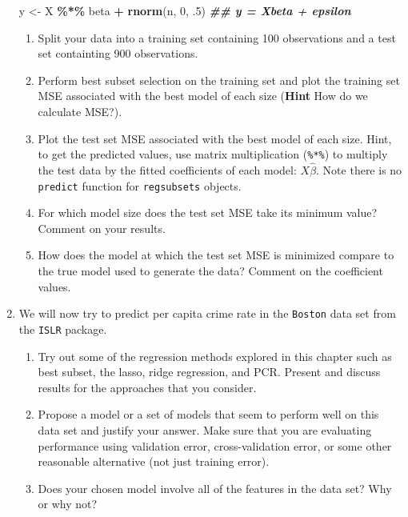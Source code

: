 \documentclass[
]{article}
\newenvironment{Shaded}{\begin{snugshade}}{\end{snugshade}}
\newcommand{\DecValTok}[1]{\textcolor[rgb]{0.00,0.00,0.81}{#1}}
\newcommand{\DocumentationTok}[1]{\textcolor[rgb]{0.56,0.35,0.01}{\textbf{\textit{#1}}}}
\newcommand{\FunctionTok}[1]{\textcolor[rgb]{0.13,0.29,0.53}{\textbf{#1}}}
\newcommand{\NormalTok}[1]{#1}
\newcommand{\OtherTok}[1]{\textcolor[rgb]{0.56,0.35,0.01}{#1}}
\newcommand{\SpecialCharTok}[1]{\textcolor[rgb]{0.81,0.36,0.00}{\textbf{#1}}}
\begin{document}
\begin{enumerate}
\begin{Shaded}
\begin{Highlighting}[]
\NormalTok{y }\OtherTok{\textless{}{-}}\NormalTok{ X }\SpecialCharTok{\%*\%}\NormalTok{ beta }\SpecialCharTok{+} \FunctionTok{rnorm}\NormalTok{(n, }\DecValTok{0}\NormalTok{, .}\DecValTok{5}\NormalTok{) }\DocumentationTok{\#\# y = Xbeta + epsilon}
\end{Highlighting}
\end{Shaded}

  \begin{enumerate}
  \def\labelenumii{\alph{enumii}.}
  \item
    Split your data into a training set containing 100 observations and
    a test set containting 900 observations.
  \item
    Perform best subset selection on the training set and plot the
    training set MSE associated with the best model of each size
    (\textbf{Hint} How do we calculate MSE?).
  \item
    Plot the test set MSE associated with the best model of each size.
    Hint, to get the predicted values, use matrix multiplication
    (\texttt{\%*\%}) to multiply the test data by the fitted
    coefficients of each model: \(X\hat{\beta}\). Note there is no
    \texttt{predict} function for \texttt{regsubsets} objects.
  \item
    For which model size does the test set MSE take its minimum value?
    Comment on your results.
  \item
    How does the model at which the test set MSE is minimized compare to
    the true model used to generate the data? Comment on the coefficient
    values.
  \end{enumerate}
\item
  We will now try to predict per capita crime rate in the
  \texttt{Boston} data set from the \texttt{ISLR} package.

  \begin{enumerate}
  \def\labelenumii{\alph{enumii}.}
  \item
    Try out some of the regression methods explored in this chapter such
    as best subset, the lasso, ridge regression, and PCR. Present and
    discuss results for the approaches that you consider.
  \item
    Propose a model or a set of models that seem to perform well on this
    data set and justify your answer. Make sure that you are evaluating
    performance using validation error, cross-validation error, or some
    other reasonable alternative (not just training error).
  \item
    Does your chosen model involve all of the features in the data set?
    Why or why not?
  \end{enumerate}
\end{enumerate}
\end{document}
